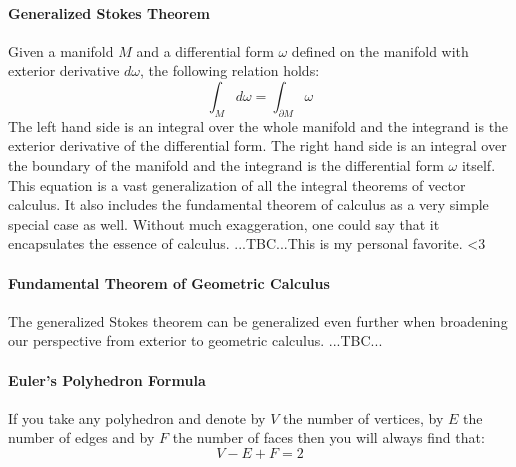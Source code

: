 \paragraph{Generalized Stokes Theorem}
Given a manifold $M$ and a differential form $\omega$ defined on the manifold with exterior derivative $d \omega$, the following relation holds:
\begin{equation}
\int_{M} d \omega = \int_{\partial M} \omega
\end{equation}
The left hand side is an integral over the whole manifold and the integrand is the exterior derivative of the differential form. The right hand side is an integral over the boundary of the manifold and the integrand is the differential form $\omega$ itself. This equation is a vast generalization of all the integral theorems of vector calculus. It also includes the fundamental theorem of calculus as a very simple special case as well. Without much exaggeration, one could say that it encapsulates the essence of calculus. ...TBC...This is my personal favorite. <3



\paragraph{Fundamental Theorem of Geometric Calculus}
The generalized Stokes theorem can be generalized even further when broadening our perspective from exterior to geometric calculus. ...TBC...


\paragraph{Euler's Polyhedron Formula}
If you take any polyhedron and denote by $V$ the number of vertices, by $E$ the number of edges and by $F$ the number of faces then you will always find that:
\begin{equation}
V - E + F = 2
\end{equation}




